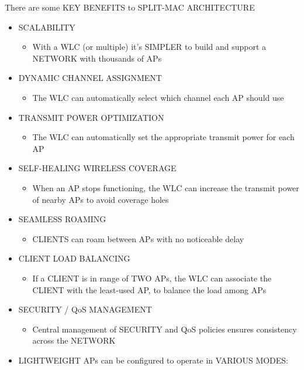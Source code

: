 There are some KEY BENEFITS to SPLIT-MAC ARCHITECTURE

\begin{itemize}
\tightlist
\item
  SCALABILITY

  \begin{itemize}
  \tightlist
  \item
    With a WLC (or multiple) it's SIMPLER to build and support a NETWORK
    with thousands of APs
  \end{itemize}
\item
  DYNAMIC CHANNEL ASSIGNMENT

  \begin{itemize}
  \tightlist
  \item
    The WLC can automatically select which channel each AP should use
  \end{itemize}
\item
  TRANSMIT POWER OPTIMIZATION

  \begin{itemize}
  \tightlist
  \item
    The WLC can automatically set the appropriate transmit power for
    each AP
  \end{itemize}
\item
  SELF-HEALING WIRELESS COVERAGE

  \begin{itemize}
  \tightlist
  \item
    When an AP stops functioning, the WLC can increase the transmit
    power of nearby APs to avoid coverage holes
  \end{itemize}
\item
  SEAMLESS ROAMING

  \begin{itemize}
  \tightlist
  \item
    CLIENTS can roam between APs with no noticeable delay
  \end{itemize}
\item
  CLIENT LOAD BALANCING

  \begin{itemize}
  \tightlist
  \item
    If a CLIENT is in range of TWO APs, the WLC can associate the CLIENT
    with the least-used AP, to balance the load among APs
  \end{itemize}
\item
  SECURITY / QoS MANAGEMENT

  \begin{itemize}
  \tightlist
  \item
    Central management of SECURITY and QoS policies ensures consistency
    across the NETWORK
  \end{itemize}
\item
  LIGHTWEIGHT APs can be configured to operate in VARIOUS MODES:


\end{itemize}
